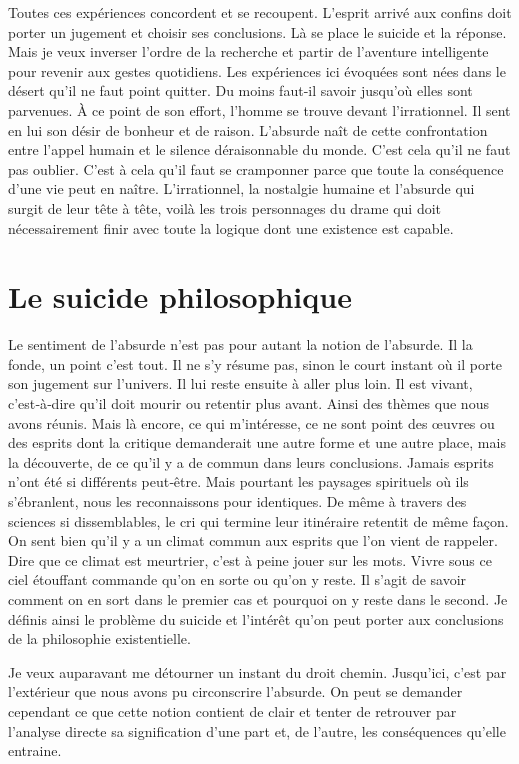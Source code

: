 \documentclass{book}
\begin{document}
Toutes ces expériences concordent et se recoupent. L'esprit arrivé aux confins doit porter un jugement et choisir ses conclusions. Là se place le suicide et la réponse. Mais je veux inverser l'ordre de la recherche et partir de l'aventure intelligente pour revenir aux gestes quotidiens. Les expériences ici évoquées sont nées dans le désert qu'il ne faut point quitter. Du moins faut-il savoir jusqu'où elles sont parvenues. À ce point de son effort, l'homme se trouve devant l'irrationnel. Il sent en lui son désir de bonheur et de raison. L'absurde naît de cette confrontation entre l'appel humain et le silence déraisonnable du monde. C'est cela qu'il ne faut pas oublier. C'est à cela qu'il faut se cramponner parce que toute la conséquence d'une vie peut en naître. L'irrationnel, la nostalgie humaine et l'absurde qui surgit de leur tête à tête, voilà les trois personnages du drame qui doit nécessairement finir avec toute la logique dont une existence est capable.

\section{Le suicide philosophique}

Le sentiment de l'absurde n'est pas pour autant la notion de l'absurde. Il la fonde, un point c'est tout. Il ne s'y résume pas, sinon le court instant où il porte son jugement sur l'univers. Il lui reste ensuite à aller plus loin. Il est vivant, c'est‑à‑dire qu'il doit mourir ou retentir plus avant. Ainsi des thèmes que nous avons réunis. Mais là encore, ce qui m'intéresse, ce ne sont point des œuvres ou des esprits dont la critique demanderait une autre forme et une autre place, mais la découverte, de ce qu'il y a de commun dans leurs conclusions. Jamais esprits n'ont été si différents peut‑être. Mais pourtant les paysages spirituels où ils s'ébranlent, nous les reconnaissons pour identiques. De même à travers des sciences si dissemblables, le cri qui termine leur itinéraire retentit de même façon. On sent bien qu'il y a un climat commun aux esprits que l'on vient de rappeler. Dire que ce climat est meurtrier, c'est à peine jouer sur les mots. Vivre sous ce ciel étouffant commande qu'on en sorte ou qu'on y reste. Il s'agit de savoir comment on en sort dans le premier cas et pourquoi on y reste dans le second. Je définis ainsi le problème du suicide et l'intérêt qu'on peut porter aux conclusions de la philosophie existentielle.

Je veux auparavant me détourner un instant du droit chemin. Jusqu'ici, c'est par l'extérieur que nous avons pu circonscrire l'absurde. On peut se demander cependant ce que cette notion contient de clair et tenter de retrouver par l'analyse directe sa signification d'une part et, de l'autre, les conséquences qu'elle entraine.
\end{document}
